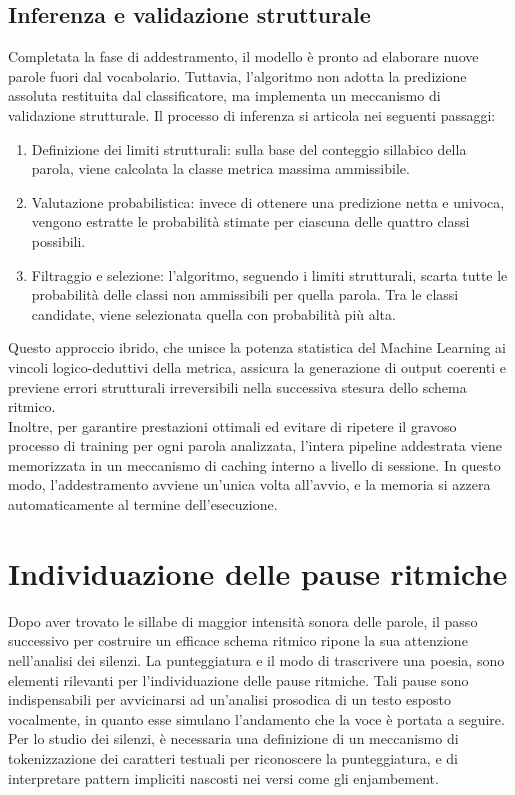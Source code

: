 \subsection{Inferenza e validazione strutturale}
Completata la fase di addestramento, il modello è pronto ad elaborare nuove parole fuori dal vocabolario. Tuttavia, l'algoritmo non adotta la predizione 
assoluta restituita dal classificatore, ma implementa un meccanismo di validazione strutturale. Il processo di inferenza si articola nei seguenti passaggi:
\begin{enumerate}
      \item Definizione dei limiti strutturali: sulla base del conteggio sillabico della parola, viene calcolata la classe metrica massima ammissibile.
      \item Valutazione probabilistica: invece di ottenere una predizione netta e univoca, vengono estratte le probabilità stimate per ciascuna delle 
      quattro classi possibili.
      \item Filtraggio e selezione: l'algoritmo, seguendo i limiti strutturali, scarta tutte le probabilità delle classi non ammissibili per quella parola. 
      Tra le classi candidate, viene selezionata quella con probabilità più alta.
\end{enumerate}
Questo approccio ibrido, che unisce la potenza statistica del Machine Learning ai vincoli logico-deduttivi della metrica, assicura la generazione di output 
coerenti e previene errori strutturali irreversibili nella successiva stesura dello schema ritmico.\\
Inoltre, per garantire prestazioni ottimali ed evitare di ripetere il gravoso processo di training per ogni parola analizzata, l'intera pipeline addestrata 
viene memorizzata in un meccanismo di caching interno a livello di sessione. In questo modo, l'addestramento avviene un'unica volta all'avvio, e la memoria 
si azzera automaticamente al termine dell'esecuzione.



\section{Individuazione delle pause ritmiche}
Dopo aver trovato le sillabe di maggior intensità sonora delle parole, il passo successivo per costruire un efficace schema ritmico ripone la sua attenzione 
nell'analisi dei silenzi. La punteggiatura e il modo di trascrivere una poesia, sono elementi rilevanti per l'individuazione delle pause ritmiche. 
Tali pause sono indispensabili per avvicinarsi ad un'analisi prosodica di un testo esposto vocalmente, in quanto esse simulano l'andamento che la voce è 
portata a seguire.\\
Per lo studio dei silenzi, è necessaria una definizione di un meccanismo di tokenizzazione dei caratteri testuali per riconoscere la punteggiatura, e di 
interpretare pattern impliciti nascosti nei versi come gli enjambement.

